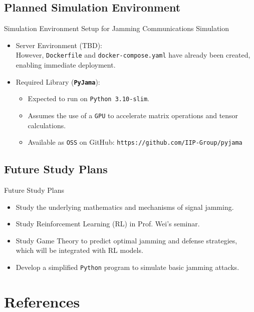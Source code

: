 \documentclass[11pt, aspectratio=169]{beamer}
\begin{document}
\subsection{Planned Simulation Environment}

\begin{frame}{Simulation Environment}
  Setup for Jamming Communications Simulation
  \begin{itemize}
    \item Server Environment (TBD): \\
      However, \texttt{Dockerfile} and \texttt{docker-compose.yaml} have already been created, enabling immediate deployment.
    \item Required Library (\textbf{\texttt{PyJama}}): 
      \begin{itemize}
        \item Expected to run on \texttt{Python 3.10-slim}.
        \item Assumes the use of a \texttt{GPU} to accelerate matrix operations and tensor calculations.
        \item Available as \texttt{OSS} on GitHub: \texttt{https://github.com/IIP-Group/pyjama}
      \end{itemize}
  \end{itemize}
\end{frame}

\subsection{Future Study Plans}

\begin{frame}{Future Study Plans}
  \begin{itemize}
    \item Study the underlying mathematics and mechanisms of signal jamming.
    \item Study Reinforcement Learning (RL) in Prof. Wei's seminar.
    \item Study Game Theory to predict optimal jamming and defense strategies, which will be integrated with RL models.

    \vspace{1em}

    \item Develop a simplified \texttt{Python} program to simulate basic jamming attacks.
  \end{itemize}
\end{frame}

\section{References}
\end{document}
